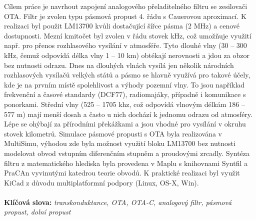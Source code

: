 \noindent Cílem práce je navrhout zapojení analogového přeladitelného filtru se zesilovači OTA. Filtr je zvolen typu pásmová propust 4. řádu s Cauerovou aproximací. K realizaci byl použit LM13700 kvůli dostačující šířce pásma (2 MHz) a cenové dostupnosti. Mezní kmitočet byl zvolen v řádu stovek kHz, což umožňuje využití např. pro přenos rozhlasového vysílání v atmosféře. Tyto dlouhé vlny (30 -- 300 kHz, čemuž odpovídá délka vlny 1 -- 10 km) obtékají nerovnosti a jdou za obzor bez nutnosti odrazu. Dnes na dlouhých vlnách vysílá jen několik národních rozhlasových vysílačů velkých států a pásmo se hlavně využívá pro takové účely, kde je na prvním místě spolehlivost a výhody pozemní vlny. To jsou například frekvenční a časové standardy (DCF77), radiomajáky, případně i komunikace s ponorkami. Střední vlny (525 -- 1705 khz, což odpovídá vlnovým délkám 186 -- 577 m) mají menší dosah a často u nich dochází k jednomu odrazu od atmosféry. Lépe se ohýbají za přírodními překážkami a jsou vhodné pro vysílání v okruhu stovek kilometrů. Simulace pásmové propusti s OTA byla realizována v MultiSimu, výhodou zde byla možnost využití bloku LM13700 bez nutnosti modelovat obvod vstupním diferenčním stupněm a proudovými zrcadly. Syntéza filtru z matematického hlediska byla provedena v Maplu s knihovnami Syntfil a PraCAn vyvinutými katedrou teorie obvodů. K praktické realizaci byl využit KiCad z důvodu multiplatformní podpory (Linux, OS-X, Win). \\
\\
\noindent \textbf{Klíčová slova:} \textit{transkonduktance, OTA, OTA-C, analogový filtr, pásmová propust, dolní propust}\\

